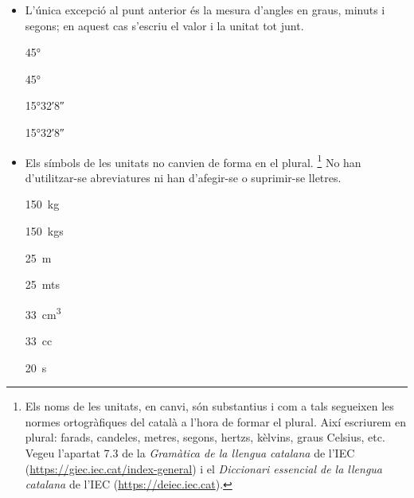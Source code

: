 \begin{itemize}
\textcolor{Green}\faCheckSquare{} \qty{25}{V}

\textcolor{Red}\faTimesCircle{} 25V

\textcolor{Green}\faCheckSquare{} \qty{40}{\degreeCelsius}

\textcolor{Red}\faTimesCircle{} 40\unit{\degreeCelsius}

\textcolor{Red}\faTimesCircle{} 40\unit{\degree} C

\textcolor{Green}\faCheckSquare{} \qty{20}{nF}

\textcolor{Red}\faTimesCircle{} 20nF


\item  L'única excepció al punt anterior és la mesura d'angles en graus, minuts i segons; en aquest cas s'escriu el valor i la unitat tot junt.

\textcolor{Green}\faCheckSquare{} \ang{45}

\textcolor{Red}\faTimesCircle{} \ang[number-angle-product = \,]{45}

\textcolor{Green}\faCheckSquare{} \ang{15;32;8}

\textcolor{Red}\faTimesCircle{} \ang[number-angle-product = \,]{15;32;8}

\item Els símbols de les unitats no canvien de forma en el plural. \footnote{Els noms de les unitats,  en canvi, són substantius i com a tals segueixen les normes ortogràfiques del català a l'hora de formar el plural. Així escriurem en plural: farads, candeles, metres, segons, hertzs, kèlvins, graus Celsius, etc. Vegeu l'apartat 7.3 de la \textit{Gramàtica de la llengua catalana} de l'IEC (\href{https://giec.iec.cat/index-general}{https:/\!\!/giec.iec.cat/index-general}) i el \textit{Diccionari essencial de la llengua catalana} de l'IEC (\href{https://deiec.iec.cat/}{https:/\!\!/deiec.iec.cat}).
} No han
d'utilitzar-se abreviatures ni han d'afegir-se o suprimir-se
lletres.

\textcolor{Green}\faCheckSquare{} \qty{150}{kg}

\textcolor{Red}\faTimesCircle{} \qty{150}{kgs}

\textcolor{Green}\faCheckSquare{} \qty{25}{m}

\textcolor{Red}\faTimesCircle{} \qty{25}{mts}

\textcolor{Green}\faCheckSquare{} \qty{33}{cm^3}

\textcolor{Red}\faTimesCircle{} \qty{33}{cc}

\textcolor{Green}\faCheckSquare{} \qty{20}{s}


\end{itemize}
